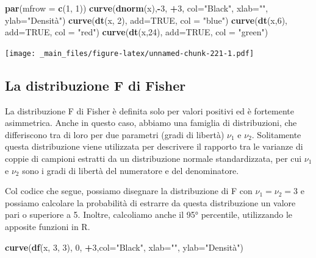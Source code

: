 \documentclass[a4paper,12pt,oneside]{book}
\newenvironment{Shaded}{\begin{snugshade}}{\end{snugshade}}
\newcommand{\KeywordTok}[1]{\textcolor[rgb]{0.13,0.29,0.53}{\textbf{#1}}}
\newcommand{\DataTypeTok}[1]{\textcolor[rgb]{0.13,0.29,0.53}{#1}}
\newcommand{\DecValTok}[1]{\textcolor[rgb]{0.00,0.00,0.81}{#1}}
\newcommand{\StringTok}[1]{\textcolor[rgb]{0.31,0.60,0.02}{#1}}
\newcommand{\OtherTok}[1]{\textcolor[rgb]{0.56,0.35,0.01}{#1}}
\newcommand{\OperatorTok}[1]{\textcolor[rgb]{0.81,0.36,0.00}{\textbf{#1}}}
\newcommand{\NormalTok}[1]{#1}
\theoremstyle{definition}
\theoremstyle{definition}
\theoremstyle{definition}
\theoremstyle{remark}
\begin{document}
\begin{Shaded}
\begin{Highlighting}[]
\KeywordTok{par}\NormalTok{(}\DataTypeTok{mfrow =} \KeywordTok{c}\NormalTok{(}\DecValTok{1}\NormalTok{, }\DecValTok{1}\NormalTok{))}
\KeywordTok{curve}\NormalTok{(}\KeywordTok{dnorm}\NormalTok{(x),}\OperatorTok{-}\DecValTok{3}\NormalTok{, }\OperatorTok{+}\DecValTok{3}\NormalTok{, }\DataTypeTok{col=}\StringTok{"Black"}\NormalTok{, }\DataTypeTok{xlab=}\StringTok{""}\NormalTok{,}
     \DataTypeTok{ylab=}\StringTok{"Densità"}\NormalTok{)}
\KeywordTok{curve}\NormalTok{(}\KeywordTok{dt}\NormalTok{(x, }\DecValTok{2}\NormalTok{), }\DataTypeTok{add=}\OtherTok{TRUE}\NormalTok{, }\DataTypeTok{col =} \StringTok{"blue"}\NormalTok{)}
\KeywordTok{curve}\NormalTok{(}\KeywordTok{dt}\NormalTok{(x,}\DecValTok{6}\NormalTok{), }\DataTypeTok{add=}\OtherTok{TRUE}\NormalTok{, }\DataTypeTok{col =} \StringTok{"red"}\NormalTok{)}
\KeywordTok{curve}\NormalTok{(}\KeywordTok{dt}\NormalTok{(x,}\DecValTok{24}\NormalTok{), }\DataTypeTok{add=}\OtherTok{TRUE}\NormalTok{, }\DataTypeTok{col =} \StringTok{"green"}\NormalTok{)}
\end{Highlighting}
\end{Shaded}

\texttt{[image: \_main\_files/figure-latex/unnamed-chunk-221-1.pdf]}

\subsection{La distribuzione F di
Fisher}\label{la-distribuzione-f-di-fisher}

La distribuzione F di Fisher è definita solo per valori positivi ed è
fortemente asimmetrica. Anche in questo caso, abbiamo una famiglia di
distribuzioni, che differiscono tra di loro per due parametri (gradi di
libertà) \(\nu_1\) e \(\nu_2\). Solitamente questa distribuzione viene
utilizzata per descrivere il rapporto tra le varianze di coppie di
campioni estratti da un distribuzione normale standardizzata, per cui
\(\nu_1\) e \(\nu_2\) sono i gradi di libertà del numeratore e del
denominatore.

Col codice che segue, possiamo disegnare la distribuzione di F con
\(\nu_1 = \nu_2 = 3\) e possiamo calcolare la probabilità di estrarre da
questa distribuzione un valore pari o superiore a 5. Inoltre, calcoliamo
anche il 95° percentile, utilizzando le apposite funzioni in R.

\begin{Shaded}
\begin{Highlighting}[]
\KeywordTok{curve}\NormalTok{(}\KeywordTok{df}\NormalTok{(x, }\DecValTok{3}\NormalTok{, }\DecValTok{3}\NormalTok{), }\DecValTok{0}\NormalTok{, }\OperatorTok{+}\DecValTok{3}\NormalTok{,}\DataTypeTok{col=}\StringTok{"Black"}\NormalTok{,}
     \DataTypeTok{xlab=}\StringTok{""}\NormalTok{, }\DataTypeTok{ylab=}\StringTok{"Densità"}\NormalTok{)}
\end{Highlighting}
\end{Shaded}
\end{document}
